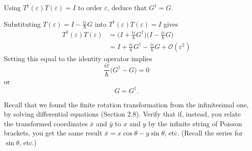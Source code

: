 \documentclass[../principles-of-quantum-mechanics.tex]{subfiles}
\begin{document}
\begin{questions}
		\question Using $T^\dagger(\varepsilon)T(\varepsilon)=I$ to order $\varepsilon$, deduce that $G^\dagger = G$.
		
		\begin{solution}
			Substituting $T(\varepsilon) = I - \frac{i\varepsilon}{\hbar}G$ into $T^\dagger(\varepsilon)T(\varepsilon) = I$ gives
			\begin{align*}
				T^\dagger(\varepsilon)T(\varepsilon) &= \Big(I + \frac{i\varepsilon}{\hbar}G^\dagger\Big)\Big(I - \frac{i\varepsilon}{\hbar}G\Big) \\
				&= I + \frac{i\varepsilon}{\hbar}G^\dagger- \frac{i\varepsilon}{\hbar}G + \mathcal{O}(\varepsilon^2)
			\end{align*}
			Setting this equal to the identity operator implies
			$$\frac{i\varepsilon}{\hbar}\Big(G^\dagger - G\Big) = 0$$
			or 
			$$G = G^\dagger.$$
		\end{solution}
	
		\question Recall that we found the finite rotation transformation from the infinitesimal one, by solving differential equations (Section 2.8). Verify that if, instead, you relate the transformed coordinates $\bar{x}$ and $\bar{y}$ to $x$ and $y$ by the infinite string of Poisson brackets, you get the same result $\bar{x} = x\cos\theta - y\sin\theta$, etc. (Recall the series for $\sin\theta$, etc.)
		

\end{questions}
\end{document}
